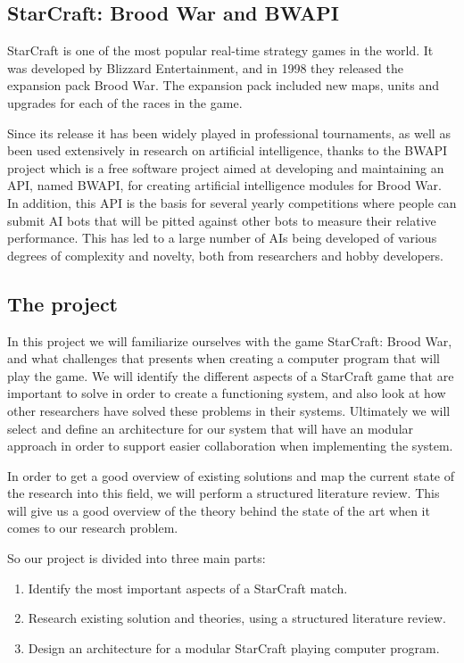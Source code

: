 \subsection{StarCraft: Brood War and BWAPI}
StarCraft is one of the most popular real-time strategy games in the world. It
was developed by Blizzard Entertainment, and in 1998 they released the expansion
pack Brood War. The expansion pack included new maps, units and upgrades for
each of the races in the game.
 
Since its release it has been widely played in professional tournaments, as well
as been used extensively in research on artificial intelligence, thanks to the
BWAPI project which is a free software project aimed at developing and
maintaining an API, named BWAPI, for creating artificial intelligence modules
for Brood War. In addition, this API is the basis for several yearly
competitions where people can submit AI bots that will be pitted against other
bots to measure their relative performance. This has led to a large number of
AIs being developed of various degrees of complexity and novelty, both from
researchers and hobby developers. 

\subsection{The project}
In this project we will familiarize ourselves with the game StarCraft: Brood
War, and what challenges that presents when creating a computer program that
will play the game. We will identify the different aspects of a StarCraft game
that are important to solve in order to create a functioning system, and also
look at how other researchers have solved these problems in their systems.
Ultimately we will select and define an architecture for our system that will
have an modular approach in order to support easier collaboration when
implementing the system. 

In order to get a good overview of existing solutions and map the current state
of the research into this field, we will perform a structured literature review.
This will give us a good overview of the theory behind the state of the art
when it comes to our research problem.

So our project is divided into three main parts:
\begin{enumerate}
  \item Identify the most important aspects of a StarCraft match.
  \item Research existing solution and theories, using a structured literature
review.
  \item Design an architecture for a modular StarCraft playing computer program.
\end{enumerate}


